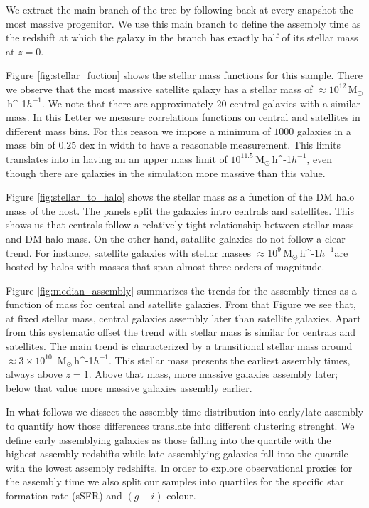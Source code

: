 \documentclass[fleqn,usenatbib]{mnras}
\newcommand{\Msunh}{\,{\rm M}$_{\odot}$\,\ifmmode h^{-1}\else $h^{-1}$\fi}
\begin{document}
We extract the main branch of the tree by following back at every
snapshot the most massive progenitor.
We use this main branch to define the assembly time as the redshift
at which the galaxy in the branch has exactly half of its stellar mass
at $z=0$.   


Figure \ref{fig:stellar_fuction} shows the stellar mass functions for
this sample.
There we observe that the most massive satellite galaxy has a stellar
mass of $\approx 10^{12}$\Msunh.    
We note that there are approximately $20$ central galaxies
with a similar mass.
In this Letter we measure correlations functions on central and
satellites in different mass bins.
For this reason we impose a  minimum of $1000$ galaxies
in a mass bin of $0.25$ dex in width to have a reasonable
measurement. 
This limits translates into in having an an upper mass limit of
$10^{11.5}$\Msunh, even though there are galaxies in the simulation
more massive than this value.

Figure \ref{fig:stellar_to_halo} shows the stellar mass as a function
of the DM halo mass of the host.
The panels split the galaxies intro centrals and satellites. 
This shows us that centrals follow a relatively tight relationship
between stellar mass and DM halo mass.
On the other hand, satallite galaxies do not follow a clear trend.
For instance, satellite galaxies with stellar masses $\approx
10^{9}$\Msunh are hosted by halos with masses that span almost three
orders of magnitude.

Figure \ref{fig:median_assembly} summarizes the trends for the
assembly times as a function of mass for central and satellite
galaxies.
From that Figure we see that, at fixed stellar mass, central galaxies
assembly later than  satellite galaxies.
Apart from this systematic offset the trend with stellar mass is
similar for centrals and satellites.
The main trend is characterized by a transitional stellar mass around 
$\approx 3\times 10^{10}$ \Msunh.
This stellar mass presents the earliest assembly times, always above $z=1$.
Above that mass, more massive galaxies assembly later; below that
value more massive galaxies assembly earlier.

In what follows we dissect the assembly time distribution into
early/late assembly to quantify how those differences translate into
different clustering strenght.
We define early assemblying galaxies as those falling into the
quartile with the highest assembly redshifts while late assemblying
galaxies fall into the quartile with the lowest assembly redshifts.
In order to explore observational proxies for the assembly time we
also split our samples into quartiles for the specific star formation
rate (sSFR) and $(g-i)$ colour. 
\end{document}
